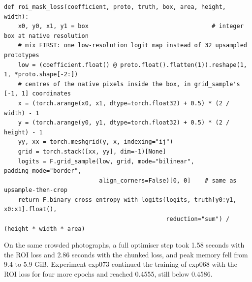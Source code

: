 \begin{lstlisting}[caption={A native-resolution mask loss evaluated only inside the box. Condensed
from \file{shared/roi\_mask\_loss.py}.},label=lst:yolo-roi]
def roi_mask_loss(coefficient, proto, truth, box, area, height, width):
    x0, y0, x1, y1 = box                                   # integer box at native resolution
    # mix FIRST: one low-resolution logit map instead of 32 upsampled prototypes
    low = (coefficient.float() @ proto.float().flatten(1)).reshape(1, 1, *proto.shape[-2:])
    # centres of the native pixels inside the box, in grid_sample's [-1, 1] coordinates
    x = (torch.arange(x0, x1, dtype=torch.float32) + 0.5) * (2 / width) - 1
    y = (torch.arange(y0, y1, dtype=torch.float32) + 0.5) * (2 / height) - 1
    yy, xx = torch.meshgrid(y, x, indexing="ij")
    grid = torch.stack([xx, yy], dim=-1)[None]
    logits = F.grid_sample(low, grid, mode="bilinear", padding_mode="border",
                           align_corners=False)[0, 0]    # same as upsample-then-crop
    return F.binary_cross_entropy_with_logits(logits, truth[y0:y1, x0:x1].float(),
                                              reduction="sum") / (height * width * area)
\end{lstlisting}

On the same crowded photographs, a full optimiser step took 1.58 seconds with the ROI loss and 2.86
seconds with the chunked loss, and peak memory fell from 9.4 to 5.9 GiB. Experiment exp073 continued
the training of exp068 with the ROI loss for four more epochs and reached 0.4555, still below 0.4586.

